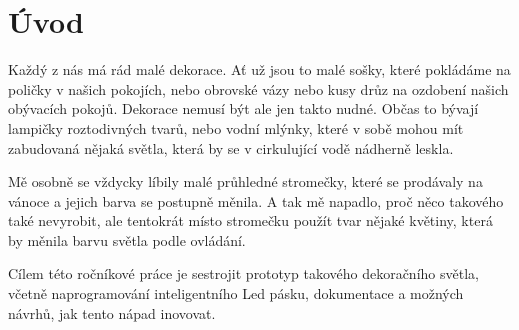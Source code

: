 \chapter*{Úvod}

Každý z nás má rád malé dekorace. Ať už jsou to malé sošky, které pokládáme na poličky v našich pokojích, nebo obrovské vázy nebo kusy drůz na ozdobení našich obývacích pokojů. Dekorace nemusí být ale jen takto nudné. Občas to bývají lampičky roztodivných tvarů, nebo vodní mlýnky, které v sobě mohou mít zabudovaná nějaká světla, která by se v cirkulující vodě \cite{schommers} nádherně leskla.

Mě osobně se vždycky líbily malé průhledné stromečky, které se prodávaly na vánoce a jejich barva se postupně měnila. A tak mě napadlo, proč něco takového také nevyrobit, ale tentokrát místo stromečku použít tvar nějaké květiny, která by měnila barvu světla podle ovládání. %

Cílem této ročníkové práce je sestrojit prototyp takového dekoračního světla, včetně naprogramování inteligentního Led pásku, dokumentace a možných návrhů, jak tento nápad inovovat.

%
%
